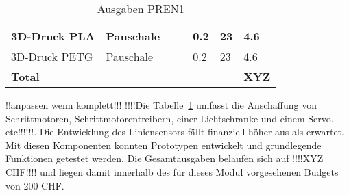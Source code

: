 \documentclass[main.tex]{subfiles} %
\begin{document}
\begin{table}[h]
{\begin{tabular}{|p{3cm}|p{2.5cm}|p{2.5cm}|p{3cm}|p{1cm}|p{1.5cm}|p{1cm}|}
        3D-Druck PLA                           & Pauschale              &                               &                                 & 0.2                 & 23                         & 4.6                              \\ \hline
        3D-Druck PETG                          & Pauschale              &                               &                                 & 0.2                 & 23                         & 4.6                              \\ \hline

        \textbf{Total}                         &                        &                               &                                 &                     &                            & \textbf{XYZ}                   \\ \hline
    \end{tabular}
    }
    \caption{Ausgaben PREN1}
    \label{tab:Ausgaben_PREN1}
\end{table}


!!anpassen wenn komplett!!!
!!!!Die Tabelle~\ref{tab:Ausgaben_PREN1} umfasst die Anschaffung von Schrittmotoren, Schrittmotorentreibern, einer
Lichtschranke und einem Servo. etc!!!!!!. Die Entwicklung des Liniensensors fällt finanziell höher aus als erwartet.
Mit diesen Komponenten konnten Prototypen entwickelt und grundlegende
Funktionen getestet werden. Die Gesamtausgaben belaufen sich auf !!!!XYZ CHF!!!! und liegen damit innerhalb des
für dieses Modul vorgesehenen Budgets von 200 CHF.
\end{document}
